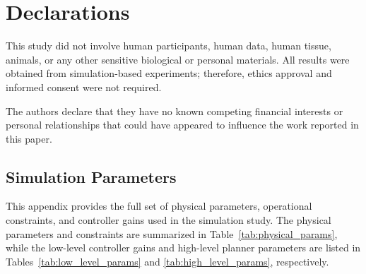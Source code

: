 \documentclass[pdflatex,sn-basic]{sn-jnl}%
\begin{document}
\section*{Declarations}

This study did not involve human participants, human data, human tissue, animals, or any other sensitive biological or personal materials. All results were obtained from simulation-based experiments; therefore, ethics approval and informed consent were not required.

The authors declare that they have no known competing financial interests or personal relationships that could have appeared to influence the work reported in this paper.

\begin{appendices}

\section{Simulation Parameters}\label{sec:app_parameters}
    This appendix provides the full set of physical parameters, operational constraints, and controller gains used in the simulation study. The physical parameters and constraints are summarized in Table~\ref{tab:physical_params}, while the low-level controller gains and high-level planner parameters are listed in Tables~\ref{tab:low_level_params} and \ref{tab:high_level_params}, respectively.

    \begin{table}
        \centering

\end{table}
\end{appendices}
\end{document}
